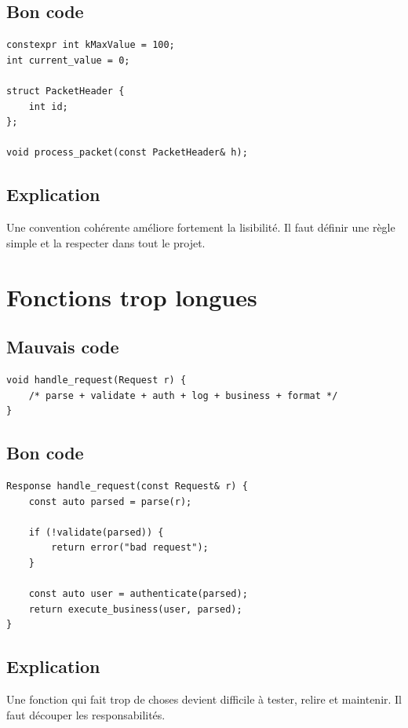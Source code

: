 \documentclass[a4paper,11pt]{report}
\begin{document}
\section{Bon code}
\begin{lstlisting}
constexpr int kMaxValue = 100;
int current_value = 0;

struct PacketHeader {
    int id;
};

void process_packet(const PacketHeader& h);
\end{lstlisting}

\section{Explication}
Une convention cohérente améliore fortement la lisibilité.
Il faut définir une règle simple et la respecter dans tout le projet.

\chapter{Fonctions trop longues}

\section{Mauvais code}
\begin{lstlisting}
void handle_request(Request r) {
    /* parse + validate + auth + log + business + format */
}
\end{lstlisting}

\section{Bon code}
\begin{lstlisting}
Response handle_request(const Request& r) {
    const auto parsed = parse(r);

    if (!validate(parsed)) {
        return error("bad request");
    }

    const auto user = authenticate(parsed);
    return execute_business(user, parsed);
}
\end{lstlisting}

\section{Explication}
Une fonction qui fait trop de choses devient difficile à tester, relire et maintenir.
Il faut découper les responsabilités.
\end{document}
